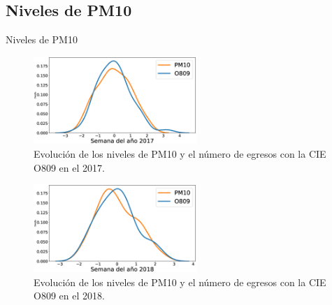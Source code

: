 \documentclass[11pt]{beamer}
\begin{document}
\subsection{Niveles de PM10}
\begin{frame}{Niveles de PM10}
\begin{multicols}{2}
\begin{figure}[!h]
\begin{center}
   \includegraphics[trim=63 0 0 0,clip,width=0.55\textwidth]{PM10_O809_2017.eps}
   \end{center}
    \caption[Series de tiempo 2017 PM10 y O809]{Evolución de los niveles de PM10 y el número de egresos con la CIE O809 en el 2017.}
    \label{serie_de_tiempo_2017_PM10}
\end{figure}
\begin{figure}[h!]
\begin{center}
   \includegraphics[trim=63 0 0 0,clip,width=0.55\textwidth]{PM10_O809_2018.eps}
   \end{center}
    \caption[Series de tiempo 2018 PM10 y O809]{Evolución de los niveles de PM10 y el número de egresos con la CIE O809 en el 2018.}
    \label{serie_de_tiempo_2018_PM10}
\end{figure}
\end{multicols}
\end{frame}
\end{document}
